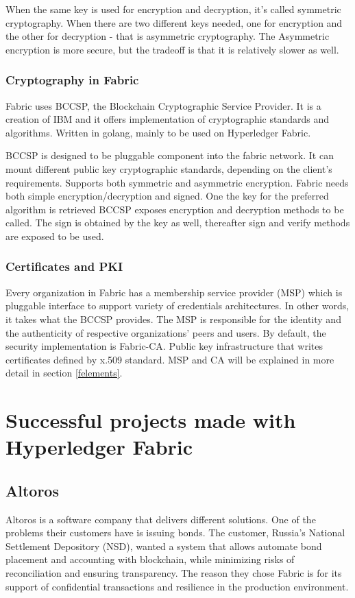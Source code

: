 \documentclass[a4paper,11pt]{report}
\begin{document}
When the same key is used for encryption and decryption, it’s called symmetric cryptography. When there are two different keys needed, one for encryption and the other for decryption - that is asymmetric cryptography. The Asymmetric encryption is more secure, but the tradeoff is that it is relatively slower as well. \cite{symasym}

\subsubsection{Cryptography in Fabric}

	Fabric uses BCCSP, the Blockchain Cryptographic Service Provider. It is a creation of IBM and it offers implementation of cryptographic standards and algorithms. Written in golang, mainly to be used on Hyperledger Fabric. 

	BCCSP is designed to be pluggable component into the fabric network. It can mount different public key cryptographic standards, depending on the client’s requirements. Supports both symmetric and asymmetric encryption. 
Fabric needs both simple encryption/decryption and signed. One the key for the preferred algorithm is retrieved BCCSP exposes encryption and decryption methods to be called. The sign is obtained by the key as well, thereafter sign and verify methods are exposed to be used. \cite{bccsp}


\subsubsection{Certificates and PKI}
	Every organization in Fabric has a membership service provider (MSP) which is pluggable interface to support variety of credentials architectures. In other words, it takes what the BCCSP provides. The MSP is responsible for the identity and the authenticity of respective organizations’ peers and users. By default, the security implementation is Fabric-CA. Public key infrastructure that writes certificates defined by x.509 standard. MSP and CA will be explained in more detail in section \ref{felements}.

\section{Successful projects made with Hyperledger Fabric}
\label{successfulFabric}

\subsection{Altoros}
\label{altoros}
Altoros is a software company that delivers different solutions. One of the problems their customers have is issuing bonds. The customer, Russia's National Settlement Depository (NSD), wanted a system that allows automate bond placement and accounting with blockchain, while minimizing risks of reconciliation and ensuring transparency. The reason they chose Fabric is for its support of confidential transactions and resilience in the production environment. \cite{altoros}
\end{document}
